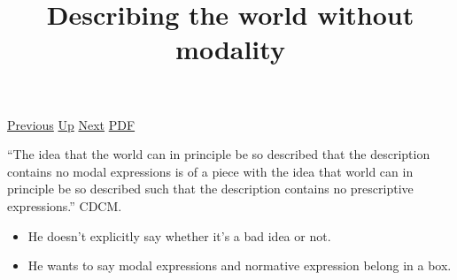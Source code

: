 \documentclass[12pt,a4paper]{report}
\begin{document}
 \href{doc/phil/People/Sellars/Quotes/Describingandexplaining.html}{Previous} 
 \href{doc/phil/People/Sellars/Quotes.html}{Up} 
 \href{doc/phil/People/Sellars/Quotes/Exemplification.html}{Next} 
 \href{doc/phil/People/Sellars/Quotes/Describingtheworldwithoutmodality.pdf}{PDF} 
\title{Describing the world without modality}
``The idea that the world can in principle be so described that the description
contains no modal expressions is of a piece with the idea that world can in
principle be so described such that the description contains no prescriptive
expressions.'' CDCM.

\begin{itemize}
    \item He doesn't explicitly say whether it's a bad idea or not.
    \item He wants to say modal expressions and normative expression belong in
          a box.
\end{itemize}
\end{document}
